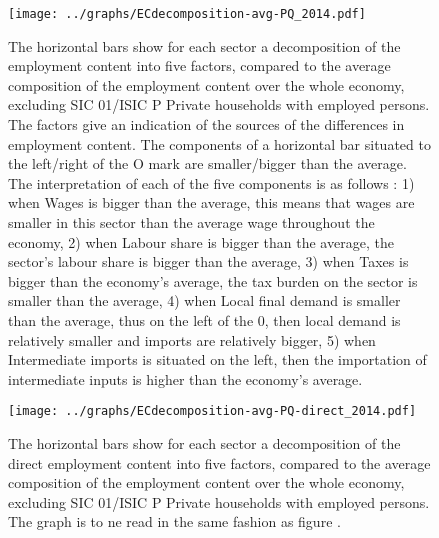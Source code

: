 \documentclass[12pt,english]{article}
\begin{document}
\begin{figure}[!ht]
	\centering
	\texttt{[image: ../graphs/ECdecomposition-avg-PQ\_2014.pdf]}
	\caption{\footnotesize \label{Decomposition_PQ}The horizontal bars show for each sector a decomposition of the employment content into five factors, compared to the average composition of the employment content over the whole economy, excluding SIC 01/ISIC P Private households with employed persons. The factors give an indication of the sources of the differences in employment content. The components of a horizontal bar situated to the left/right of the O mark are smaller/bigger than the average. The interpretation of each of the five components is as follows : 1) when Wages is bigger than the average, this means that wages are smaller in this sector than the average wage throughout the economy, 2) when Labour share is bigger than the average, the sector's labour share is bigger than the average, 3) when Taxes is bigger than the economy's average, the tax burden on the sector is smaller than the average, 4) when Local final demand is smaller than the average, thus on the left of the 0, then local demand is relatively smaller and imports are relatively bigger, 5) when Intermediate imports is situated on the left, then the importation of intermediate inputs is higher than the economy's average.}
\end{figure}	


\begin{figure}[!ht]
	\centering
	\texttt{[image: ../graphs/ECdecomposition-avg-PQ-direct\_2014.pdf]}
	\caption{\footnotesize \label{Decomposition_PQ_direct}The horizontal bars show for each sector a decomposition of the direct employment content into five factors, compared to the average composition of the employment content over the whole economy, excluding SIC 01/ISIC P Private households with employed persons. The graph is to ne read in the same fashion as figure \label{Decomposition_PQ}. %
	}
\end{figure}	
\end{document}
